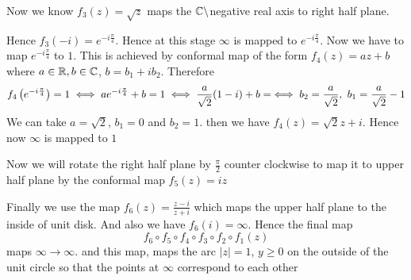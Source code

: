 \documentclass[a4paper, 11pt]{article}
\begin{document}
{\begin{center}
\end{center}
Now we know $f_3(z)=\sqrt{z}$ maps the $\mathbb{C}\setminus$negative real axis to right half plane.
\begin{center}
\end{center}
Hence $f_3(-i)=e^{-i\frac{\pi}{4}}$. Hence at this stage $\infty $ is mapped to $e^{-i\frac{\pi}{4}}$. Now we have to map $e^{-i\frac{\pi}{4}}$ to $1$. This is achieved by conformal map of the form $f_4(z)=az+b$ where $a\in\mathbb{R},b\in\mathbb{C}$, $b=b_1+ib_2$. Therefore $$f_4\left(e^{-i\frac{\pi}{4}}\right)=1\iff ae^{-i\frac{\pi}{4}}+b=1\iff \frac{a}{\sqrt{2}}(1-i)+b=\iff b_2=\frac{a}{\sqrt{2}},\ b_1=\frac{a}{\sqrt{2}}-1$$
We can take $a=\sqrt{2}$, $b_1=0$ and $b_2=1$. then we have $f_4(z)=\sqrt{2}z+i$. Hence now $\infty$ is mapped to $1$

Now we will rotate the right half plane by $\frac{\pi}{2}$ counter clockwise to map it to upper half plane by the conformal map $f_5(z)=iz$
\begin{center}
\end{center}

Finally we use the map $f_6(z)=\frac{z-i}{z+i}$ which maps the upper half plane to the inside of unit disk. And also we have $f_6(i)=\infty$. Hence the final map $$f_6\circ f_5\circ f_4\circ f_3\circ f_2\circ f_1(z)$$ maps $\infty\to\infty$. and this map, maps the arc $|z|=1$, $y\geq 0$ on the outside of the unit circle so that the points at  $\infty$ correspond to each other

	}
	
\end{document}
